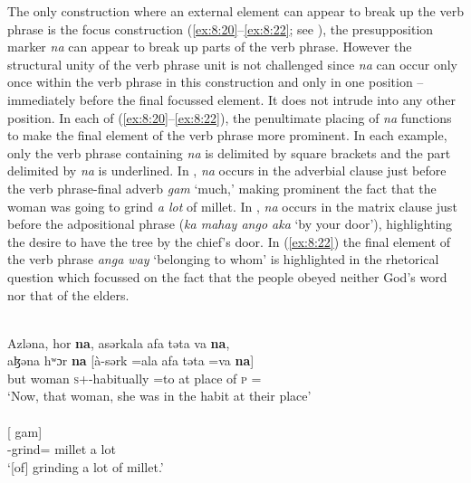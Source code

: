 The only construction where an external element can appear to break up the verb phrase is the focus construction (\ref{ex:8:20}--\ref{ex:8:22}; see ), the presupposition marker \textit{na} can appear to break up parts of the verb phrase. However the structural unity of the verb phrase unit is not challenged since \textit{na} can occur only once within the verb phrase in this construction and only in one position -- immediately before the final focussed element. It does not intrude into any other position. In each of (\ref{ex:8:20}--\ref{ex:8:22}), the penultimate placing of \textit{na} functions to make the final element of the verb phrase more prominent. In each example, only the verb phrase containing \textit{na }is delimited by square brackets and the part delimited by\textit{ na}  is underlined. In ,\textit{ na }occurs in the adverbial clause just before the verb phrase-final adverb \textit{gam} ‘much,’ making prominent the fact that the woman was going to grind \textit{a lot} of millet.  In , \textit{na} occurs in the matrix clause just before the adpositional phrase (\textit{ka  mahay  ango  aka} ‘by your door’), highlighting the desire to have the tree by the chief's door. In (\ref{ex:8:22}) the final element of the verb phrase \textit{anga way} ‘belonging to whom' is highlighted in the rhetorical question which focussed on the fact that the people obeyed neither God's word nor that of the elders.  


\ea \label{ex:8:20}\\
Azləna,  hor  \textbf{na},  asərkala  afa  təta  va  \textbf{na},\\  
\gll  aɮəna  hʷɔr  \textbf{na}  [à-sərk         =ala   afa            təta  =va  \textbf{na}]\\
      but  woman  {\PSP}    \textsc{s}+{\PFV}-habitually =to    {at place of}  \textsc{p}       ={\PRF}  {\PSP}\\
\glt  ‘Now, that woman, she was in the habit at their place’\\
\\
\gll  {}[   {gam}]\\
      \db {\DEP}-grind={\PLU}   millet  {\PSP}   {a lot}\\
\glt  ‘[of] grinding a lot of millet.’
\z

